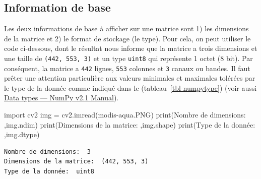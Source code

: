 \documentclass[
  french,
  11pt,
  letterpaper,
  open=any,
  twoside=false,
  french]{scrbook}
\newenvironment{Shaded}{\begin{snugshade}}{\end{snugshade}}
\newcommand{\BuiltInTok}[1]{\textcolor[rgb]{0.00,0.23,0.31}{#1}}
\newcommand{\ImportTok}[1]{\textcolor[rgb]{0.00,0.46,0.62}{#1}}
\newcommand{\NormalTok}[1]{\textcolor[rgb]{0.00,0.23,0.31}{#1}}
\newcommand{\OperatorTok}[1]{\textcolor[rgb]{0.37,0.37,0.37}{#1}}
\newcommand{\StringTok}[1]{\textcolor[rgb]{0.13,0.47,0.30}{#1}}
\begin{document}
\subsection{Information de base}\label{information-de-base}

Les deux informations de base à afficher sur une matrice sont 1) les
dimensions de la matrice et 2) le format de stockage (le type). Pour
cela, on peut utiliser le code ci-dessous, dont le résultat nous informe
que la matrice a trois dimensions et une taille de
\texttt{(442,\ 553,\ 3)} et un type \texttt{uint8} qui représente 1
octet (8 bit). Par conséquent, la matrice a \texttt{442} lignes,
\texttt{553} colonnes et \texttt{3} canaux ou bandes. Il faut prêter une
attention particulière aux valeurs minimales et maximales tolérées par
le type de la donnée comme indiqué dans le (tableau~\ref{tbl-numpytype})
(voir aussi
\href{https://numpy.org/doc/stable/user/basics.types.html}{Data types
--- NumPy v2.1 Manual}).

\begin{Shaded}
\begin{Highlighting}[]
\ImportTok{import}\NormalTok{ cv2}
\NormalTok{img }\OperatorTok{=}\NormalTok{ cv2.imread(}\StringTok{\textquotesingle{}modis{-}aqua.PNG\textquotesingle{}}\NormalTok{)}
\BuiltInTok{print}\NormalTok{(}\StringTok{\textquotesingle{}Nombre de dimensions: \textquotesingle{}}\NormalTok{,img.ndim)}
\BuiltInTok{print}\NormalTok{(}\StringTok{\textquotesingle{}Dimensions de la matrice: \textquotesingle{}}\NormalTok{,img.shape)}
\BuiltInTok{print}\NormalTok{(}\StringTok{\textquotesingle{}Type de la donnée: \textquotesingle{}}\NormalTok{,img.dtype)}
\end{Highlighting}
\end{Shaded}

\begin{verbatim}
Nombre de dimensions:  3
Dimensions de la matrice:  (442, 553, 3)
Type de la donnée:  uint8
\end{verbatim}
\end{document}
